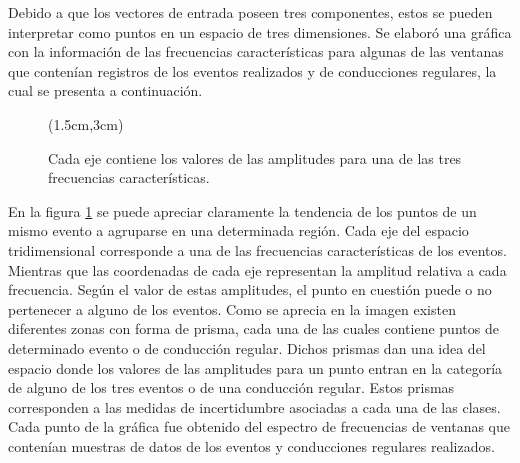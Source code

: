Debido a que los vectores de entrada poseen tres componentes, estos se pueden interpretar como puntos en un espacio de tres dimensiones.
Se elaboró una gráfica con la información de las frecuencias características para algunas de las ventanas que contenían registros de los eventos realizados y de conducciones regulares, la cual se presenta a continuación.
\pagebreak

\begin{figure}[H]
\centering
\vspace{8.5cm}
\begin{textblock*}{\textwidth}(1.5cm,3cm)
\end{textblock*}
\caption{Cada eje contiene los valores de las amplitudes para una de las tres frecuencias características.}
\label{Cajas}
\end{figure}

En la figura \ref{Cajas} se puede apreciar claramente la tendencia de los puntos de un mismo evento a agruparse en una determinada región.
Cada eje del espacio tridimensional corresponde a una de las frecuencias características de los eventos. 
Mientras que las coordenadas de cada eje representan la amplitud relativa a cada frecuencia. 
Según el valor de estas amplitudes, el punto en cuestión puede o no pertenecer a alguno de los eventos. 
Como se aprecia en la imagen existen diferentes zonas con forma de prisma, cada una de las cuales contiene puntos de determinado evento o de conducción regular. 
Dichos prismas dan una idea del espacio donde los valores de las amplitudes para un punto entran en la categoría de alguno de los tres eventos o de una conducción regular.
Estos prismas corresponden a las medidas de incertidumbre asociadas a cada una de las clases. 
Cada punto de la gráfica fue obtenido del espectro de frecuencias de ventanas que contenían muestras de datos de los eventos y conducciones regulares realizados.

